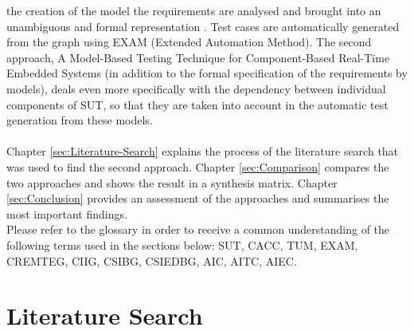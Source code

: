 the creation of the model the requirements are analysed and brought
into an unambiguous and formal representation\textquotedbl{} \cite{Siegl2010}.
Test cases are automatically generated from the graph using EXAM (Extended
Automation Method). The second approach, \textquotedbl A Model-Based
Testing Technique for Component-Based Real-Time Embedded Systems\textquotedbl{}
(in addition to the formal specification of the requirements by models),
deals even more specifically with the dependency between individual
components of SUT, so that they are taken into account in the automatic
test generation from these models.\\
 \\
Chapter \ref{sec:Literature-Search} explains the process of the literature
search that was used to find the second approach. Chapter \ref{sec:Comparison}
compares the two approaches and shows the result in a synthesis matrix.
Chapter \ref{sec:Conclusion} provides an assessment of the approaches
and summarises the most important findings.\\
Please refer to the glossary in order to receive a common understanding of the following terms used in the sections below: SUT, CACC, TUM, EXAM, CREMTEG, CIIG, CSIBG, CSIEDBG, AIC, AITC, AIEC.

\section{Literature Search\label{sec:Literature-Search}}

